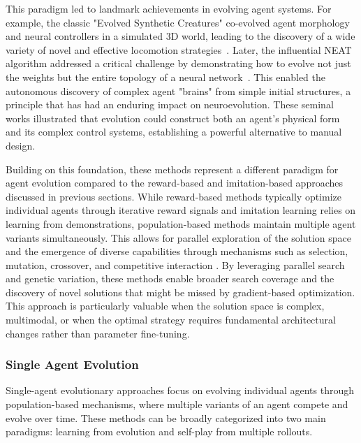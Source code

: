 \documentclass[10pt]{article} %
\begin{document}
This paradigm led to landmark achievements in evolving agent systems. For example, the classic "Evolved Synthetic Creatures" co-evolved agent morphology and neural controllers in a simulated 3D world, leading to the discovery of a wide variety of novel and effective locomotion strategies~\citep{karl1994evolving}. Later, the influential NEAT algorithm addressed a critical challenge by demonstrating how to evolve not just the weights but the entire topology of a neural network~\citep{stanley2002evolving}. This enabled the autonomous discovery of complex agent "brains" from simple initial structures, a principle that has had an enduring impact on neuroevolution. These seminal works illustrated that evolution could construct both an agent's physical form and its complex control systems, establishing a powerful alternative to manual design.

Building on this foundation, these methods represent a different paradigm for agent evolution compared to the reward-based and imitation-based approaches discussed in previous sections. While reward-based methods typically optimize individual agents through iterative reward signals and imitation learning relies on learning from demonstrations, population-based methods maintain multiple agent variants simultaneously. This allows for parallel exploration of the solution space and the emergence of diverse capabilities through mechanisms such as selection, mutation, crossover, and competitive interaction \citep{zhang2025nature}. By leveraging parallel search and genetic variation, these methods enable broader search coverage and the discovery of novel solutions that might be missed by gradient-based optimization. This approach is particularly valuable when the solution space is complex, multimodal, or when the optimal strategy requires fundamental architectural changes rather than parameter fine-tuning.




\subsubsection{Single Agent Evolution}

Single-agent evolutionary approaches focus on evolving individual agents through population-based mechanisms, where multiple variants of an agent compete and evolve over time. These methods can be broadly categorized into two main paradigms: learning from evolution and self-play from multiple rollouts.
\end{document}
